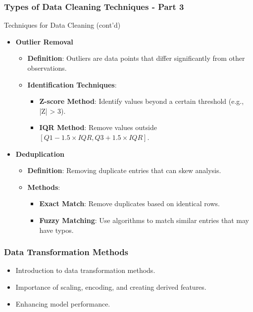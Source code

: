 \documentclass[aspectratio=169]{beamer}
\begin{document}
\begin{frame}[fragile]
    \frametitle{Types of Data Cleaning Techniques - Part 3}
    \begin{block}{Techniques for Data Cleaning (cont’d)}
        \begin{itemize}
            \item \textbf{Outlier Removal}
                \begin{itemize}
                    \item \textbf{Definition}: Outliers are data points that differ significantly from other observations.
                    \item \textbf{Identification Techniques}:
                        \begin{itemize}
                            \item \textbf{Z-score Method}: Identify values beyond a certain threshold (e.g., |Z| > 3).
                            \item \textbf{IQR Method}: Remove values outside \([Q1 - 1.5 \times IQR, Q3 + 1.5 \times IQR]\).
                        \end{itemize}
                \end{itemize}

            \item \textbf{Deduplication}
                \begin{itemize}
                    \item \textbf{Definition}: Removing duplicate entries that can skew analysis.
                    \item \textbf{Methods}:
                        \begin{itemize}
                            \item \textbf{Exact Match}: Remove duplicates based on identical rows.
                            \item \textbf{Fuzzy Matching}: Use algorithms to match similar entries that may have typos.
                        \end{itemize}
                \end{itemize}
        \end{itemize}
    \end{block}
\end{frame}

\begin{frame}
    \frametitle{Data Transformation Methods}
    \begin{itemize}
        \item Introduction to data transformation methods.
        \item Importance of scaling, encoding, and creating derived features.
        \item Enhancing model performance.
    \end{itemize}
\end{frame}
\end{document}

